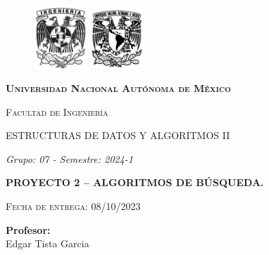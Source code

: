 {
  \setlength{\columnsep}{4mm}
  \setlength{\parindent}{0.5in}
  \setlength{\parskip}{1em}
  \renewcommand{\baselinestretch}{1.5}
  \setlength{\headheight}{33pt}

  \thispagestyle{empty}
			\begin{figure}[ht]
					 \includegraphics[width=2cm]{fi.jpg}
					 \label{escudoFI}
				\endminipage
					 \includegraphics[height = 2.25cm ,width=2cm]{unam.png}
					 \label{EscuoUNAM}
				 \endminipage
			 \end{figure}
			 
			 \vspace{0.1cm}
			 
			 \begin{center}
				 {\scshape\LARGE \textbf{Universidad Nacional Autónoma de México} \par}
				 {\scshape\Large Facultad de Ingeniería\par}
				 
				  {\LARGE ESTRUCTURAS DE DATOS Y ALGORITMOS II}
	 
				 \begin{center}
				 
				 {\LARGE \textit{Grupo: 07 - Semestre: 2024-1}}
	 
				 

				 {\LARGE\bfseries PROYECTO 2 – ALGORITMOS DE BÚSQUEDA.\par}
	 
			 {\scshape\Large Fecha de entrega: 08/10/2023\par}	
	 
						 \LARGE	{ \textbf{Profesor:}}\\%
			 \large		{ Edgar Tista Garcia}
			 
			 \vspace{-0.5cm}	
			 

\end{center}
\end{center}}
